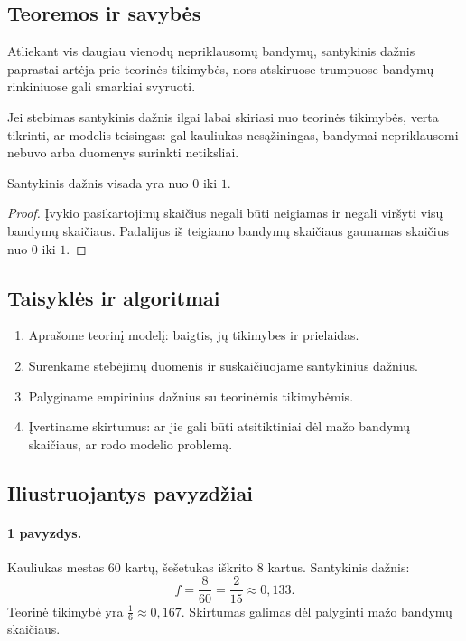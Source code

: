 \subsection{Teoremos ir savybės}

\begin{savybe}
Atliekant vis daugiau vienodų nepriklausomų bandymų, santykinis dažnis paprastai artėja prie teorinės tikimybės, nors atskiruose trumpuose bandymų rinkiniuose gali smarkiai svyruoti.
\end{savybe}

\begin{savybe}
Jei stebimas santykinis dažnis ilgai labai skiriasi nuo teorinės tikimybės, verta tikrinti, ar modelis teisingas: gal kauliukas nesąžiningas, bandymai nepriklausomi nebuvo arba duomenys surinkti netiksliai.
\end{savybe}

\begin{teorema}
Santykinis dažnis visada yra nuo $0$ iki $1$.
\end{teorema}
\begin{proof}
Įvykio pasikartojimų skaičius negali būti neigiamas ir negali viršyti visų bandymų skaičiaus. Padalijus iš teigiamo bandymų skaičiaus gaunamas skaičius nuo $0$ iki $1$.
\end{proof}

\subsection{Taisyklės ir algoritmai}

\begin{enumerate}
\item Aprašome teorinį modelį: baigtis, jų tikimybes ir prielaidas.
\item Surenkame stebėjimų duomenis ir suskaičiuojame santykinius dažnius.
\item Palyginame empirinius dažnius su teorinėmis tikimybėmis.
\item Įvertiname skirtumus: ar jie gali būti atsitiktiniai dėl mažo bandymų skaičiaus, ar rodo modelio problemą.
\end{enumerate}

\subsection{Iliustruojantys pavyzdžiai}

\paragraph{1 pavyzdys.}
Kauliukas mestas $60$ kartų, šešetukas iškrito $8$ kartus. Santykinis dažnis:
\[
f=\frac{8}{60}=\frac{2}{15}\approx0,133.
\]
Teorinė tikimybė yra $\frac16\approx0,167$. Skirtumas galimas dėl palyginti mažo bandymų skaičiaus.


